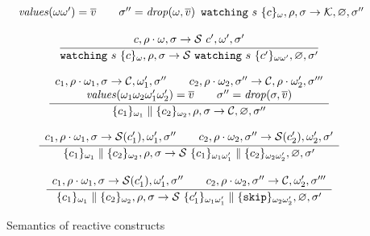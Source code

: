 \begin{figure}
{{$$\begin{array}{c}
{\begin{array}{c}
          {\mathit{values}}(\omega\omega') = \overline{v} \qquad
          \sigma'' = {\mathit{drop}}(\omega,\overline{v})
        \end{array}
      }{
        {\tt{watching}}~s~\{c\}_\omega,\rho,\sigma\rightarrow \mathcal{K}, \varnothing,\sigma''
      }
      \\\\
      \cfrac{
      c,\rho \cdot \omega,\sigma\rightarrow {\mathcal{S}}~c',\omega',\sigma'
      }{
      {\tt{watching}}~s~\{c\}_\omega,\rho,\sigma \rightarrow {\mathcal{S}}~{\tt{watching}}~s~\{c'\}_{\omega\omega'},\varnothing,\sigma'
      }
      \\\\
      \cfrac{
      \begin{array}{c}
        c_1, \rho \cdot \omega_1, \sigma \rightarrow
        {\mathcal{C}} ,\omega_1' , \sigma''
        \qquad
        c_2, \rho \cdot \omega_2 , \sigma'' \rightarrow
        {\mathcal{C}} ,\rho \cdot \omega_2' ,\sigma'''
        \\
        {\mathit{values}}(\omega_1\omega_2\omega_1'\omega_2') = \overline{v} \qquad 
        \sigma''={\mathit{drop}}(\sigma, \overline{v})
      \end{array}
      }{
      \{c_1\}_{\omega_1} \parallel \{c_2\}_{\omega_2}, \rho ,\sigma \rightarrow
      {\mathcal{C}}, \varnothing,\sigma''
      }
      \\\\
      \cfrac{
      \begin{array}{c}
        c_1, \rho \cdot \omega_1, \sigma \rightarrow
        {\mathcal{S}}(c_1') ,\omega_1' , \sigma''
        \qquad
        c_2, \rho \cdot \omega_2 , \sigma'' \rightarrow
        {\mathcal{S}}(c_2') ,\omega_2' ,\sigma'
      \end{array}
      }{
      \{c_1\}_{\omega_1} \parallel \{c_2\}_{\omega_2}, \rho ,\sigma \rightarrow
      {\mathcal{S}}~\{c_1\}_{\omega_1\omega_1'} \parallel \{c_2\}_{\omega_2\omega_2'}, \varnothing, \sigma'
      }
      \\\\
      \cfrac{
      \begin{array}{c}
        c_1, \rho \cdot \omega_1, \sigma \rightarrow
        {\mathcal{S}}(c_1') ,\omega_1' , \sigma''
        \qquad
        c_2, \rho \cdot \omega_2 , \sigma'' \rightarrow
        {\mathcal{C}} ,\omega_2' ,\sigma'''
      \end{array}
      }{
      \{c_1\}_{\omega_1} \parallel \{c_2\}_{\omega_2}, \rho ,\sigma \rightarrow
      {\mathcal{S}}~\{c_1'\}_{\omega_1\omega_1'} \parallel \{{\tt{skip}}\}_{\omega_2\omega_2'}, \varnothing,\sigma'
      }
    \end{array}
  $$
  }}
  \caption{Semantics of reactive constructs}
  \label{sem-commands-react-fig}
\end{figure}

